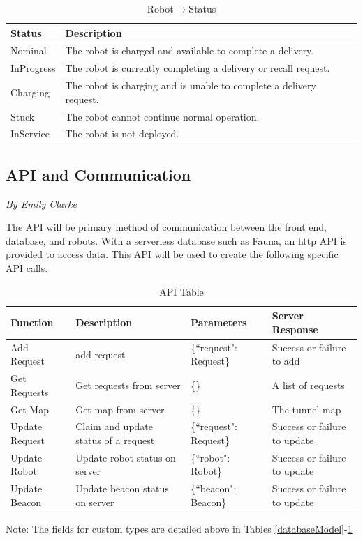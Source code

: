 \documentclass[12pt]{report}
\newcommand{\sectionAuthor}[1]{{\small\vspace{-1em}\textit{#1}}\bigskip\par}
\begin{document}
\begin{table}[H]
\centering
\caption{Robot$\rightarrow$Status}
\label{RobotStatusTable}
\centering
\begin{tabular} { | p{2.5cm} | p{12cm} | }
\hline
Status& Description \\
\hline
Nominal & The robot is charged and available to complete a delivery. \\
\hline
InProgress & The robot is currently completing a delivery or recall request. \\
\hline
Charging & The robot is charging and is unable to complete a delivery request. \\
\hline
Stuck & The robot cannot continue normal operation. \\
\hline
InService & The robot is not deployed. \\
\hline
\end{tabular}
\end{table}%

\subsection{API and Communication}
\sectionAuthor{By Emily Clarke}
The API will be primary method of communication between the front end, database, and robots. With a serverless database such as Fauna, an http API is provided to access data. This API will be used to create the following specific API calls.

\begin{table}[H]
\centering
\caption{API Table}
\label{APITable}
\centering
\begin{tabular} { | p{3cm} | p{3.5cm} | p{4cm} | p{3cm} | }
\hline
Function & Description & Parameters & Server Response\\
\hline
Add Request & add request & \{``request": Request\} & Success or failure to add \\
\hline
Get Requests & Get requests from server & \{\} & A list of requests \\
\hline
Get Map & Get map from server & \{\} & The tunnel map \\
\hline
Update Request & Claim and update status of a request & \{``request": Request\} & Success or failure to update \\
\hline
Update Robot & Update robot status on server & \{``robot": Robot\}  & Success or failure to update \\
\hline
Update Beacon & Update beacon status on server & \{``beacon": Beacon\} & Success or failure to update \\
\hline
\end{tabular}
\begin{tablenotes}
      \small
      \centering
      \item Note: The fields for custom types are detailed above in Tables \ref{databaseModel}-\ref{RobotStatusTable}
\end{tablenotes}
\end{table}%
\end{document}
